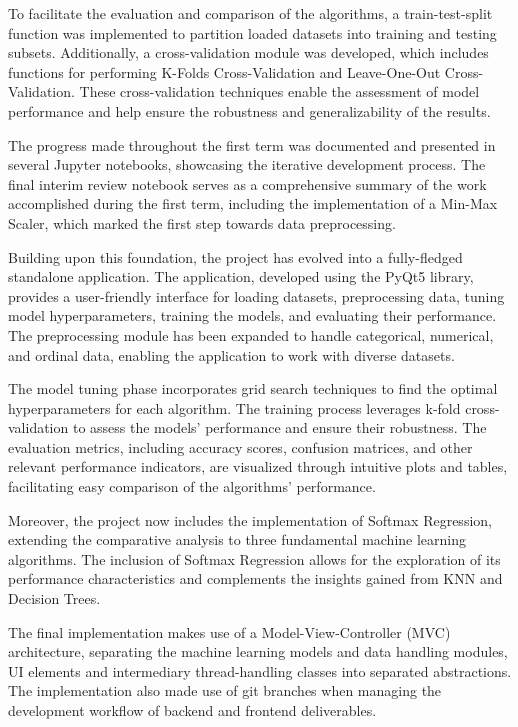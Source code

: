 \documentclass[letterpaper,10pt]{article}
\begin{document}
To facilitate the evaluation and comparison of the algorithms, a train-test-split function was implemented to partition loaded datasets into training and testing subsets. Additionally, a cross-validation module was developed, which includes functions for performing K-Folds Cross-Validation and Leave-One-Out Cross-Validation. These cross-validation techniques enable the assessment of model performance and help ensure the robustness and generalizability of the results.\par

The progress made throughout the first term was documented and presented in several Jupyter notebooks, showcasing the iterative development process. The final interim review notebook serves as a comprehensive summary of the work accomplished during the first term, including the implementation of a Min-Max Scaler, which marked the first step towards data preprocessing. \par

Building upon this foundation, the project has evolved into a fully-fledged standalone application. The application, developed using the PyQt5 library, provides a user-friendly interface for loading datasets, preprocessing data, tuning model hyperparameters, training the models, and evaluating their performance. The preprocessing module has been expanded to handle categorical, numerical, and ordinal data, enabling the application to work with diverse datasets. \par

The model tuning phase incorporates grid search techniques to find the optimal hyperparameters for each algorithm. The training process leverages k-fold cross-validation to assess the models' performance and ensure their robustness. The evaluation metrics, including accuracy scores, confusion matrices, and other relevant performance indicators, are visualized through intuitive plots and tables, facilitating easy comparison of the algorithms' performance. \par

Moreover, the project now includes the implementation of Softmax Regression, extending the comparative analysis to three fundamental machine learning algorithms. The inclusion of Softmax Regression allows for the exploration of its performance characteristics and complements the insights gained from KNN and Decision Trees. \par

The final implementation makes use of a Model-View-Controller (MVC) architecture, separating the machine learning models and data handling modules, UI elements and intermediary thread-handling classes into separated abstractions. The implementation also made use of git branches when managing the development workflow of backend and frontend deliverables. \par
\end{document}

